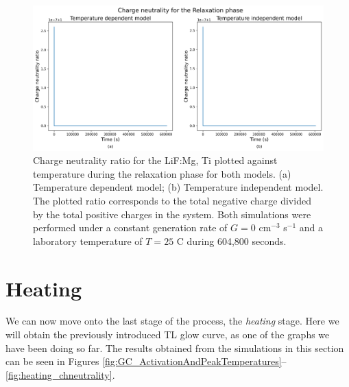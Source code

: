 \begin{figure}
    \centering
    \includegraphics[width=\textwidth]{Images/Relaxation Charge neutrality.png}
    \caption{Charge neutrality ratio for the LiF:Mg, Ti plotted against temperature during the relaxation phase for both models. (a) Temperature dependent model; (b) Temperature independent model. The plotted ratio corresponds to the total negative charge divided by the total positive charges in the system. Both simulations were performed under a constant generation rate of $G = 0$ cm$^{-3}$ s$^{-1}$ and a laboratory temperature of $T = 25$ \textdegree C during 604,800 seconds.}
    \label{fig:relaxation_chneutrality}
\end{figure}

\vspace{10pt}

\section{Heating}\label{sec:heating}

We can now move onto the last stage of the process, the \textit{heating} stage. Here we will obtain the previously introduced TL glow curve, as one of the graphs we have been doing so far. The results obtained from the simulations in this section can be seen in Figures \ref{fig:GC_ActivationAndPeakTemperatures}--\ref{fig:heating_chneutrality}. 

